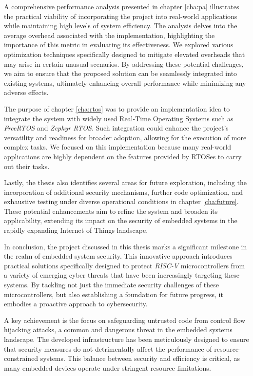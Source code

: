 A comprehensive performance analysis presented in chapter \ref{cha:pa} illustrates
the practical viability of incorporating the project into real-world applications
while maintaining high levels of system efficiency. The analysis delves into the
average overhead associated with the implementation, highlighting the importance
of this metric in evaluating its effectiveness. We explored various optimization
techniques specifically designed to mitigate elevated overheads that may arise
in certain unusual scenarios. By addressing these potential challenges, we aim
to ensure that the proposed solution can be seamlessly integrated into existing
systems, ultimately enhancing overall performance while minimizing any adverse effects.

The purpose of chapter \ref{cha:rtos} was to provide an implementation idea to integrate
the system with widely used Real-Time Operating Systems such as \textit{FreeRTOS}
and \textit{Zephyr RTOS}. Such integration could enhance the project's
versatility and readiness for broader adoption, allowing for the execution of more
complex tasks. We focused on this implementation because many real-world
applications are highly dependent on the features provided by RTOSes to carry
out their tasks.

Lastly, the thesis also identifies several areas for future exploration,
including the incorporation of additional security mechanisms, further code optimization,
and exhaustive testing under diverse operational conditions in chapter
\ref{cha:future}. These potential enhancements aim to refine the system and broaden
its applicability, extending its impact on the security of embedded systems in
the rapidly expanding Internet of Things landscape.

In conclusion, the project discussed in this thesis marks a significant milestone
in the realm of embedded system security. This innovative approach introduces
practical solutions specifically designed to protect \textit{RISC-V} microcontrollers
from a variety of emerging cyber threats that have been increasingly targeting these
systems. By tackling not just the immediate security challenges of these
microcontrollers, but also establishing a foundation for future progress, it
embodies a proactive approach to cybersecurity.

A key achievement is the focus on safeguarding untrusted code from control flow
hijacking attacks, a common and dangerous threat in the embedded systems landscape.
The developed infrastructure has been meticulously designed to ensure that
security measures do not detrimentally affect the performance of resource-constrained
systems. This balance between security and efficiency is critical, as many
embedded devices operate under stringent resource limitations.

